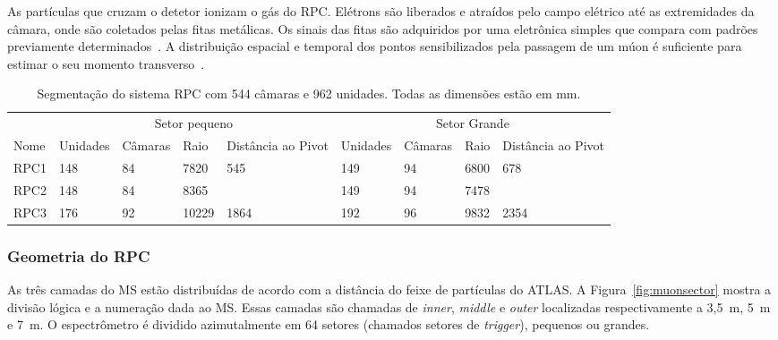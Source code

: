 As partículas que cruzam o detetor ionizam o gás do RPC. Elétrons são liberados
e atraídos pelo campo elétrico até as extremidades da câmara, onde são coletados
pelas fitas metálicas. Os sinais das fitas são adquiridos por uma eletrônica
simples que compara com padrões previamente determinados~\cite{MUONTDR1997}. A
distribuição espacial e temporal dos pontos sensibilizados pela passagem de um
múon é suficiente para estimar o seu momento transverso~\cite{ANULLI2009}.

\begin{table}[htbp!]\footnotesize
  \centering
  \tabcolsep=0.08cm
  \begin{tabular}{ m{1.5cm}   m{1.5cm}  m{1.5cm}  m{1.5cm}  m{1.5cm} m{1.5cm} m{1.5cm}  m{1.5cm}  m{1.5cm}  }
       \multicolumn{1}{c}{}& \multicolumn{4}{c}{Setor pequeno}& \multicolumn{4}{c}{Setor Grande} \\
        \cmidrule(r){2-5}
        \cmidrule(r){6-9}
      Nome & Unidades & Câmaras & Raio & Distância ao Pivot & Unidades & Câmaras & Raio & Distância ao Pivot \\
      \midrule
      RPC1 & 148 & 84 & 7820  & 545  & 149 & 94 & 6800 & 678 \\
      RPC2 & 148 & 84 & 8365  &      & 149 & 94 & 7478 &     \\
      RPC3 & 176 & 92 & 10229 & 1864 & 192 & 96 & 9832 & 2354\\
      \bottomrule
  \end{tabular}
  \caption{Segmentação do sistema RPC com 544 câmaras e 962 unidades. Todas as
  dimensões estão em mm.}
  \label{table:rpc_segmentation}

\end{table}


\subsubsection*{Geometria do RPC}

As três camadas do MS estão distribuídas de acordo com a distância do feixe de
partículas do ATLAS. A Figura~\ref{fig:muonsector} mostra a divisão lógica e a
numeração dada ao MS. Essas camadas são chamadas de \emph{inner}, \emph{middle}
e \emph{outer} localizadas respectivamente a 3,5~m, 5~m e 7~m. O espectrômetro
é dividido azimutalmente em 64 setores (chamados setores de \emph{trigger}),
pequenos ou grandes.

